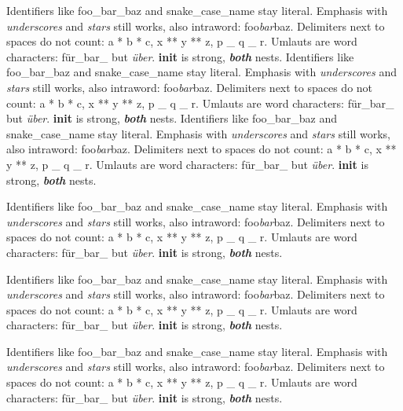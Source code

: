 Identifiers like foo\_bar\_baz and snake\_case\_name stay literal.
Emphasis with \emph{underscores} and \emph{stars} still works, also intraword: foo\emph{bar}baz.
Delimiters next to spaces do not count: a * b * c, x ** y ** z, p \_ q \_ r.
Umlauts are word characters: für\_bar\_ but \emph{über}.
\textbf{init} is strong, \emph{\textbf{both}} nests.
Identifiers like foo\_bar\_baz and snake\_case\_name stay literal.
Emphasis with \emph{underscores} and \emph{stars} still works, also intraword: foo\emph{bar}baz.
Delimiters next to spaces do not count: a * b * c, x ** y ** z, p \_ q \_ r.
Umlauts are word characters: für\_bar\_ but \emph{über}.
\textbf{init} is strong, \emph{\textbf{both}} nests.
Identifiers like foo\_bar\_baz and snake\_case\_name stay literal.
Emphasis with \emph{underscores} and \emph{stars} still works, also intraword: foo\emph{bar}baz.
Delimiters next to spaces do not count: a * b * c, x ** y ** z, p \_ q \_ r.
Umlauts are word characters: für\_bar\_ but \emph{über}.
\textbf{init} is strong, \emph{\textbf{both}} nests.
\begin{frame}[t]
Identifiers like foo\_bar\_baz and snake\_case\_name stay literal.
Emphasis with \emph{underscores} and \emph{stars} still works, also intraword: foo\emph{bar}baz.
Delimiters next to spaces do not count: a * b * c, x ** y ** z, p \_ q \_ r.
Umlauts are word characters: für\_bar\_ but \emph{über}.
\textbf{init} is strong, \emph{\textbf{both}} nests.
\end{frame}

\begin{frame}[t]
Identifiers like foo\_bar\_baz and snake\_case\_name stay literal.
Emphasis with \emph{underscores} and \emph{stars} still works, also intraword: foo\emph{bar}baz.
Delimiters next to spaces do not count: a * b * c, x ** y ** z, p \_ q \_ r.
Umlauts are word characters: für\_bar\_ but \emph{über}.
\textbf{init} is strong, \emph{\textbf{both}} nests.
\end{frame}

\begin{frame}[t]
Identifiers like foo\_bar\_baz and snake\_case\_name stay literal.
Emphasis with \emph{underscores} and \emph{stars} still works, also intraword: foo\emph{bar}baz.
Delimiters next to spaces do not count: a * b * c, x ** y ** z, p \_ q \_ r.
Umlauts are word characters: für\_bar\_ but \emph{über}.
\textbf{init} is strong, \emph{\textbf{both}} nests.
\end{frame}

